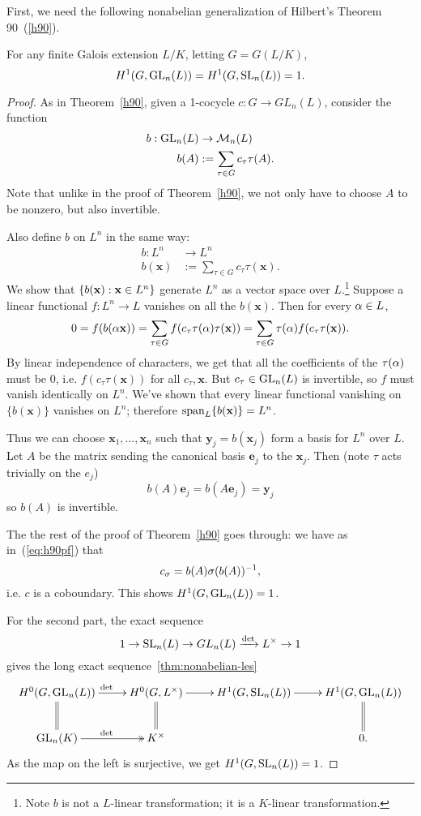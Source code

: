 First, we need the following nonabelian generalization of Hilbert's Theorem 90~(\ref{h90}).
\begin{thm}
For any finite Galois extension $L/K$, letting $G=G(L/K)$,
\[
H^1(G,\operatorname{GL}_n(L))=H^1(G,\operatorname{SL}_n(L))=1.
\]
\end{thm}
\begin{proof}
As in Theorem~\ref{h90}, given a 1-cocycle $c:G\to GL_n(L)$, consider the function
\begin{align*}
b:\operatorname{GL}_n(L)&\to \mathcal{M}_n(L)\\
b(A)&:=\sum_{\tau \in G}c_{\tau}\tau(A).
\end{align*}
Note that unlike in the proof of Theorem~\ref{h90}, we not only have to choose $A$  to be nonzero, but also invertible.

Also define $b$ on $L^n$ in the same way:
\begin{align*}
b:L^n&\to L^n\\
b(\mathbf x)&:=\sum_{\tau \in G}c_{\tau}\tau(\mathbf x).
\end{align*}
We show that $\left\{{b(\mathbf x)}:{\mathbf x\in L^n}\right\}$ generate $L^n$ as a vector space over $L$.\footnote{Note $b$ is not a $L$-linear transformation; it is a $K$-linear transformation.} Suppose a linear functional $f:L^n\to L$ vanishes on all the $b(\mathbf x)$. Then for every $\alpha\in L$,
\[
0=f(b(\alpha \mathbf x))=\sum_{\tau\in G}f(c_{\tau}\tau(\alpha)\tau(\mathbf x))
=\sum_{\tau\in G} \tau(\alpha)f(c_{\tau}\tau(\mathbf x)).
\]
By linear independence of characters, we get that all the coefficients of the $\tau(\alpha)$ must be 0, i.e. $f(c_{\tau}\tau(\mathbf x))$ for all $c_{\tau}, \mathbf x$. But $c_{\tau}\in \operatorname{GL}_n(L)$ is invertible, so $f$ must vanish identically on $L^n$. We've shown that every linear functional vanishing on $\{b(\mathbf x)\}$ vanishes on $L^n$; therefore $\operatorname{span}_L\{b(\mathbf x)\}=L^n$.

Thus we can choose $\mathbf x_1,\ldots, \mathbf x_n$ such that $\mathbf y_j=b(\mathbf x_j)$ form a basis for $L^n$ over $L$. Let $A$ be the matrix sending the canonical basis $\mathbf e_j$ to the $\mathbf x_j$. Then (note $\tau$ acts trivially on the $e_j$)
\[
b(A)\mathbf e_j=b(A\mathbf e_j)=\mathbf y_j
\]
so $b(A)$ is invertible.

The the rest of the proof of Theorem~\ref{h90} goes through: we have as in~(\ref{eq:h90pf}) that
\[
c_{\sigma}=b(A)\sigma(b(A))^{-1},
\]
i.e. $c$ is a coboundary. This shows $H^1(G,\operatorname{GL}_n(L))=1$.

For the second part, the exact sequence
\[
1\to \operatorname{SL}_n(L)\to GL_n(L)\xrightarrow{\det} L^{\times}\to 1
\]
gives the long exact sequence~\ref{thm:nonabelian-les}
\[
\xymatrix{
H^0(G,\GL_n(L))\ar[r]^{\det}\ar@{=}[d] & H^0(G,L^{\times}) \ar[r]\ar@{=}[d] & H^1(G,\SL_n(L))\ar[r] & H^1(G,\GL_n(L))\ar@{=}[d]\\
\GL_n(K) \ar@{->>}[r]^{\det}& K^{\times} & & 0.
}
\]
As the map on the left is surjective, we get $H^1(G,\operatorname{SL}_n(L))=1$. 
\end{proof}
